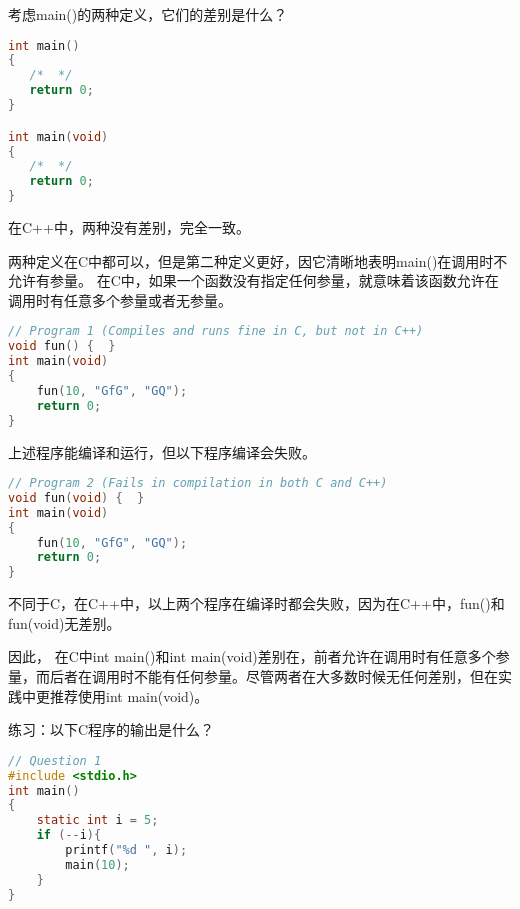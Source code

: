 \begin{frame}[fragile]
考虑main()的两种定义，它们的差别是什么？
\begin{lstlisting}[language=c,frame=single]
int main()
{
   /*  */
   return 0;
}

int main(void)
{
   /*  */
   return 0;
}
\end{lstlisting}
\end{frame}

\begin{frame}[fragile]
在C++中，两种没有差别，完全一致。

两种定义在C中都可以，但是第二种定义更好，因它清晰地表明main()在调用时不允许有参量。
在C中，如果一个函数没有指定任何参量，就意味着该函数允许在调用时有任意多个参量或者无参量。
\end{frame}

\begin{frame}[fragile]
\begin{lstlisting}[language=c,frame=single]
// Program 1 (Compiles and runs fine in C, but not in C++)
void fun() {  } 
int main(void)
{
    fun(10, "GfG", "GQ");
    return 0;
}
\end{lstlisting}
上述程序能编译和运行，但以下程序编译会失败。
\end{frame}

\begin{frame}[fragile]
\begin{lstlisting}[language=c,frame=single]
// Program 2 (Fails in compilation in both C and C++)
void fun(void) {  }
int main(void)
{
    fun(10, "GfG", "GQ");
    return 0;
}
\end{lstlisting}
不同于C，在C++中，以上两个程序在编译时都会失败，因为在C++中，fun()和fun(void)无差别。
\end{frame}

\begin{frame}[fragile]

因此， 在C中int main()和int main(void)差别在，前者允许在调用时有任意多个参量，而后者在调用时不能有任何参量。尽管两者在大多数时候无任何差别，但在实践中更推荐使用int main(void)。
\end{frame}

\begin{frame}[fragile]
练习：以下C程序的输出是什么？
\end{frame}

\begin{frame}[fragile]
\begin{lstlisting}[language=c,frame=single]
// Question 1
#include <stdio.h>
int main()
{
    static int i = 5;
    if (--i){
        printf("%d ", i);
        main(10);
    }
}
\end{lstlisting}
\end{frame}

